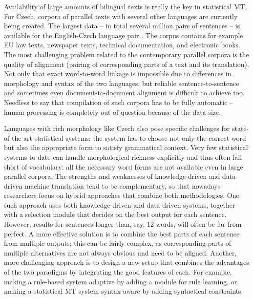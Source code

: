 \begin{multicols}{2}
Availability of large amounts of bilingual texts is really the key in statistical MT. For Czech, corpora of parallel texts with several other languages are currently being created. The largest data – in total several million pairs of sentences – is available for the English-Czech language pair \cite{Note20}. The corpus contains for example EU law texts, newspaper texts, technical documentation, and electronic books. The most challenging problem related to the contemporary parallel corpora is the quality of alignment (pairing of corresponding parts of a text and its translation). Not only that exact word-to-word linkage is impossible due to differences in morphology and syntax of the two languages, but reliable sentence-to-sentence and sometimes even document-to-document alignment is difficult to achieve too. Needless to say that compilation of such corpora has to be fully automatic – human processing is completely out of question because of the data size.

Languages with rich morphology like Czech also pose specific challenges for state-of-the-art statistical systems: the system has to choose not only the correct word but also the appropriate form to satisfy grammatical context. Very few statistical systems to date can handle morphological richness explicitly and thus often fall short of vocabulary: all the necessary word forms are not available even in large parallel corpora.
The strengths and weaknesses of knowledge-driven and data-driven machine translation tend to be complementary, so that nowadays researchers focus on hybrid approaches that combine both methodologies. One such approach uses both knowledge-driven and data-driven systems, together with a selection module that decides on the best output for each sentence. However, results for sentences longer than, say, 12 words, will often be far from perfect. A more effective solution is to combine the best parts of each sentence from multiple outputs; this can be fairly complex, as corresponding parts of multiple alternatives are not always obvious and need to be aligned. Another, more challenging approach is to design a new setup that combines the advantages of the two paradigms by integrating the good features of each. For example, making a rule-based system adaptive by adding a module for rule learning, or, making a statistical MT system syntax-aware by adding syntactical constraints.


\end{multicols}

